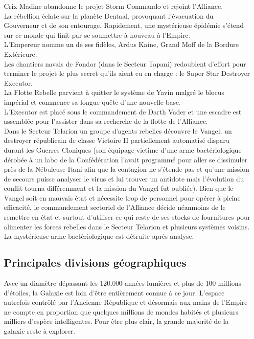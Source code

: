 \documentclass[twoside]{article}
\begin{document}
Crix Madine abandonne le projet Storm Commando et rejoint l'Alliance. \\

La rébellion éclate sur la planète Dentaal, provoquant l'évacuation du Gouverneur et de son entourage. Rapidement, une mystérieuse épidémie s'étend sur ce monde qui finit par se soumettre à nouveau à l'Empire. \\

L'Empereur nomme un de ses fidèles, Ardus Kaine, Grand Moff de la Bordure Extérieure. \\

Les chantiers navals de Fondor (dans le Secteur Tapani) redoublent d'effort pour terminer le projet le plus secret qu'ils aient eu en charge : le Super Star Destroyer Executor. \\

La Flotte Rebelle parvient à quitter le système de Yavin malgré le blocus impérial et commence sa longue quête d'une nouvelle base.\\

L'Executor est placé sous le commandement de Darth Vader et une escadre est assemblée pour l'assister dans sa recherche de la flotte de l'Alliance. \\

Dans le Secteur Telarion un groupe d'agents rebelles découvre le Vangel, un destroyer républicain de classe Victoire II partiellement automatisé disparu durant les Guerres Cloniques (son équipage victime d'une arme bactériologique dérobée à un labo de la Confédération l'avait programmé pour aller se dissimuler près de la Nébuleuse Itani afin que la contagion ne s'étende pas et qu'une mission de secours puisse analyser le virus et lui trouver un antidote mais l'évolution du conflit tourna différemment et la mission du Vangel fut oubliée). Bien que le Vangel soit en mauvais état et nécessite trop de personnel pour opérer à pleine efficacité, le commandement sectoriel de l'Alliance décide néanmoins de le remettre en état et surtout d'utiliser ce qui reste de ses stocks de fournitures pour alimenter les forces rebelles dans le Secteur Telarion et plusieurs systèmes voisins. La mystérieuse arme bactériologique est détruite après analyse. 


\subsection{Principales divisions géographiques}
Avec un diamètre dépassant les 120.000 années lumières et plus de 100 millions d'étoiles, la Galaxie est loin d'être entièrement connue à ce jour. L'espace autrefois contrôlé par l'Ancienne République et désormais aux mains de l'Empire ne compte en proportion que quelques millions de mondes habités et plusieurs milliers d'espèce intelligentes. Pour être plus clair, la grande majorité de la galaxie reste à explorer.\\
\end{document}
